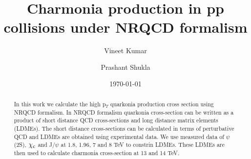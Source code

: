 \documentclass[aps,prc,preprint,superscriptaddress,showpacs,showkeys,amsmath]{revtex4-1}
\begin{document}
\newcommand{\Jpsi}{J/\psi}
\newcommand{\pT}{p_{T}}
\newcommand{\calO}{{\cal{O}}}
\newcommand{\barQ}{{\bar{Q}}}
\newcommand{\barq}{{\bar{q}}}
\newcommand{\barc}{{\bar{c}}}
\newcommand{\barb}{{\bar{b}}}
\newcommand{\baru}{\bar{u}}
\newcommand{\barv}{\bar{v}}
\newcommand{\barup}{\bar{u}_{+}}
\newcommand{\barum}{\bar{u}_{-}}
\newcommand{\barvp}{\bar{v}_{+}}
\newcommand{\barvm}{\bar{v}_{-}}
\newcommand{\charm}{{\rm{charm}}}
\newcommand{\bottom}{{\rm{bottom}}}

\newcommand{\cs}{{\hat{s}}}
\newcommand{\ct}{{\hat{t}}}
\newcommand{\cu}{{\hat{u}}}
\newcommand{\alphas}{{\alpha_{s}}}


\newcommand{\shat}{\hat{\rm s}}
\newcommand{\that}{\hat{\rm t}}
\newcommand{\uhat}{\hat{\rm u}}
\newcommand{\zhat}{\hat{\rm z}}

\newcommand{\CA}{{\cal A}}
\newcommand{\Qbar}{{\overline Q}}
\newcommand{\QQbaroctetgen}{{Q\Qbar[ ^{2S+1}L_J^{(8)}]}}
\newcommand{\QQbaroctetsingS}{{Q\Qbar[ ^1S_0^{(8)}]}}
\newcommand{\QQbaroctettripP}{{Q\Qbar[ ^3P_J^{(8)}]}}
\newcommand{\QQbaroctettripPone}{{Q\Qbar[ ^3P_1^{(8)}]}}

\def\QQbaroctettripS{Q\Qbar[ ^3S_1^{(8)}]}
\def\QQbaroctetPzero{Q\Qbar[ ^3P_0^{(8)}]}
\def\QQbaroctetPone{Q\Qbar[ ^3P_1^{(8)}]}
\def\QQbaroctetPtwo{Q\Qbar[ ^3P_2^{(8)}]}



\title{{\Large Charmonia production in pp collisions under NRQCD formalism}} 
\author{\large Vineet Kumar}
\author{\large Prashant Shukla}

\date{\today}

\begin{abstract}
  In this work we calculate the high p$_{T}$ quarkonia production cross section 
  using NRQCD formalism. In NRQCD formalism quarkonia cross-section can be written 
  as a product of short distance QCD cross-sections and long distance matrix elements (LDMEs). 
  The short distance cross-sections can be calculated in terms of perturbative QCD and LDMEs are obtained 
  using experimental data.  We use measured data of $\psi$(2S), $\chi_{\rm c}$ and J/$\psi$ 
  at 1.8, 1.96, 7 and 8 TeV to  constrin LDMEs. These LDMEs are then used to calculate charmonia 
  cross-section at 13 and 14 TeV.
\end{abstract}
\end{document}
